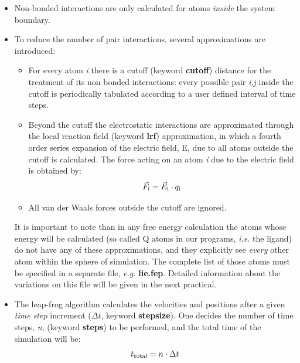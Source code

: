 \documentclass[a4paper,12pt]{article}
\begin{document}
\begin {itemize}
\item Non-bonded interactions are only calculated for atoms {\it inside} the system boundary.
\item To reduce the number of pair interactions, several approximations are introduced:
\begin {itemize}
\item For every atom {\it i} there is a cutoff (keyword {\bf cutoff}) distance for the treatment of its non bonded interactions: every possible pair {\it i,j} inside the cutoff is periodically tabulated according to a user defined interval of time steps.
\item Beyond the cutoff the electrostatic interactions are approximated through the local reaction field (keyword {\bf lrf}) approximation, in which a fourth order series expansion of the electric field, E, due to all atoms outside the cutoff is calculated. The force acting on an atom {\it i} due to the electric field is obtained by: $$\vec F_{\rm i} = \vec E_{\rm i} \cdot q_{\rm i}$$
\item All van der Waals forces outside the cutoff are ignored.
\end {itemize}
It is important to note than in any free energy calculation the
atoms whose energy will be calculated (so called Q atoms in our
programs, {\it i.e.} the ligand) do not have any of these
approximations, and they explicitly see {\it every} other atom
within the sphere of simulation. The complete list of those atoms
must be specified in a separate file, {\it e.g.} {\bf lie.fep}.
Detailed information about the variations on this file will be
given in the next practical.
\item The leap-frog algorithm calculates the velocities and positions after a given {\it time step} increment ($\Delta t$, keyword {\bf stepsize}). One decides the number of time steps, {\it n}, (keyword {\bf steps}) to be performed, and the total time of the simulation will be: $$ t_{\rm total} = n \cdot \Delta t$$
\end {itemize}
\end{document}
